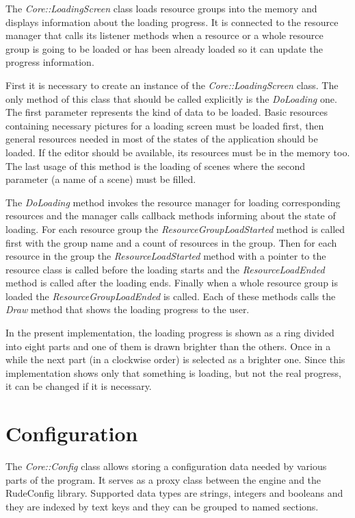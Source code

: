 \documentclass[a4paper, 12pt]{report}
\begin{document}
The \emph{Core::LoadingScreen} class loads resource groups into the memory and displays information about the loading progress. It is connected to the resource manager that calls its listener methods when a resource or a whole resource group is going to be loaded or has been already loaded so it can update the progress information.

First it is necessary to create an instance of the \emph{Core::LoadingScreen} class. The only method of this class that should be called explicitly is the \emph{DoLoading} one. The first parameter represents the kind of data to be loaded. Basic resources containing necessary pictures for a loading screen must be loaded first, then general resources needed in most of the states of the application should be loaded. If the editor should be available, its resources must be in the memory too. The last usage of this method is the loading of scenes where the second parameter (a name of a scene) must be filled.

The \emph{DoLoading} method invokes the resource manager for loading corresponding resources and the manager calls callback methods informing about the state of loading. For each resource group the \emph{ResourceGroupLoadStarted} method is called first with the group name and a count of resources in the group. Then for each resource in the group the \emph{ResourceLoadStarted} method with a pointer to the resource class is called before the loading starts and the \emph{ResourceLoadEnded} method is called after the loading ends. Finally when a whole resource group is loaded the \emph{ResourceGroupLoadEnded} is called. Each of these methods calls the \emph{Draw} method that shows the loading progress to the user.

In the present implementation, the loading progress is shown as a ring divided into eight parts and one of them is drawn brighter than the others. Once in a while the next part (in a clockwise order) is selected as a brighter one. Since this implementation shows only that something is loading, but not the real progress, it can be changed if it is necessary.

\section{Configuration}
\label{sec:config}

The \emph{Core::Config} class allows storing a configuration data needed by various parts of the program. It serves as a proxy class between the engine and the RudeConfig library\cite{rudeconfig}. Supported data types are strings, integers and booleans and they are indexed by text keys and they can be grouped to named sections.
\end{document}

